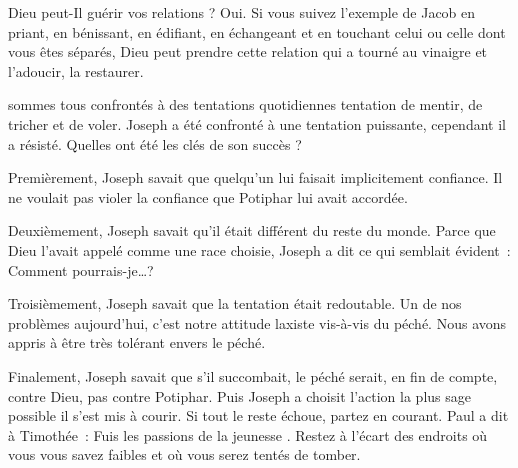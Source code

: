 Dieu peut-Il guérir vos relations ? Oui. Si vous suivez l'exemple de Jacob
 \ocadr{}en priant, en bénissant, en édifiant, en échangeant et en touchant
 celui ou celle dont vous êtes séparés, Dieu peut prendre cette relation
 qui a tourné au vinaigre et l'adoucir, la restaurer. 

\dvrule






 sommes tous confrontés à des tentations quotidiennes
 \ocadr{}tentation de mentir, de tricher et de voler.
 Joseph a été confronté à une tentation puissante,
 cependant il a résisté.
 Quelles ont été les clés de son succès ? 

Premièrement, Joseph savait que quelqu'un lui faisait implicitement confiance.
 Il ne voulait pas violer la confiance que Potiphar lui avait accordée. 

Deuxièmement, Joseph savait qu'il était différent du reste du monde.
 Parce que Dieu l'avait appelé comme une race choisie,
 Joseph a dit ce qui semblait évident~: \og Comment pourrais-je\dots{}?\fg{}

Troisièmement, Joseph savait que la tentation était redoutable.
 Un de nos problèmes aujourd'hui, c'est notre attitude laxiste
 vis-à-vis du péché.
 Nous avons appris à être très tolérant envers le péché. 

Finalement, Joseph savait que s'il succombait, le péché serait,
 en fin de compte, contre Dieu, pas contre Potiphar.
 Puis Joseph a choisit l'action la plus sage possible
 \ocadr{}il s'est mis à courir.
 Si tout le reste échoue, partez en courant.
 Paul a dit à Timothée~:
 \og Fuis les passions de la jeunesse \fg{}.
 Restez à l'écart des endroits où vous vous savez faibles
 et où vous serez tentés de tomber. 


